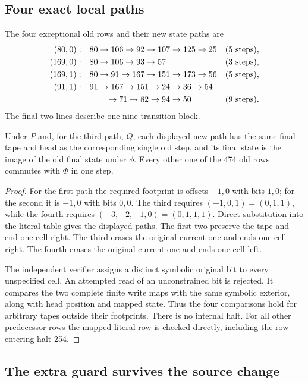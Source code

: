 \subsection{Four exact local paths}

The four exceptional old rows and their new state paths are
\begin{align*}
 (80,0):\quad&
 80\to106\to92\to107\to125\to25
 &&(5\text{ steps}),\\
 (169,0):\quad&
 80\to106\to93\to57
 &&(3\text{ steps}),\\
 (169,1):\quad&
 80\to91\to167\to151\to173\to56
 &&(5\text{ steps}),\\
 (91,1):\quad&
 91\to167\to151\to24\to36\to54\\
 &\hspace{7mm}\to71\to82\to94\to50
 &&(9\text{ steps}).
\end{align*}
The final two lines describe one nine-transition block.

\begin{lemma}
\label{lem:fourblocks}
Under $P$ and, for the third path, $Q$, each displayed new path has
the same final tape and head as the corresponding single old step,
and its final state is the image of the old final state under $\phi$.
Every other one of the 474 old rows commutes with $\Phi$ in one step.
\end{lemma}
\begin{proof}
For the first path the required footprint is offsets $-1,0$ with
bits $1,0$; for the second it is $-1,0$ with bits $0,0$.
The third requires $(-1,0,1)=(0,1,1)$, while the fourth requires
$(-3,-2,-1,0)=(0,1,1,1)$. Direct substitution into the literal table
gives the displayed paths. The first two preserve the tape and
end one cell right. The third erases the original current one
and ends one cell right. The fourth erases the original current
one and ends one cell left.

The independent verifier assigns a distinct symbolic original
bit to every unspecified cell. An attempted read of an
unconstrained bit is rejected. It compares the two complete
finite write maps with the same symbolic exterior, along with
head position and mapped state. Thus the four comparisons hold
for arbitrary tapes outside their footprints. There is no internal
halt. For all other predecessor rows the mapped literal row is
checked directly, including the row entering halt 254.
\end{proof}

\subsection{The extra guard survives the source change}

